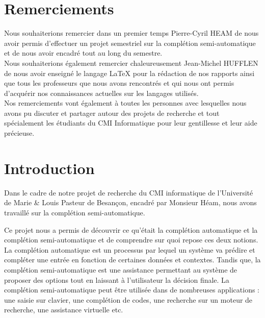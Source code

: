 \documentclass[a4paper, 11pt]{report}
\begin{document}
\chapter*{Remerciements}

Nous souhaiterions remercier dans un premier temps Pierre-Cyril HEAM de nous avoir permis d'effectuer un projet semestriel sur la complétion semi-automatique et de nous avoir encadré tout au long du semestre. \\

Nous souhaiterions également remercier chaleureusement Jean-Michel HUFFLEN de nous avoir enseigné le langage \LaTeX{} pour la rédaction de nos rapports ainsi que tous les professeurs que nous avons rencontrés et qui nous ont permis d'acquérir nos connaissances actuelles sur les langages utilisés.\\

Nos remerciements vont également à toutes les personnes avec lesquelles nous avons pu discuter et partager autour des projets de recherche et tout spécialement les étudiants du CMI Informatique pour leur gentillesse et leur aide précieuse. \\



\newpage
\tableofcontents
\listoffigures



\chapter*{Introduction} %

Dans le cadre de notre projet de recherche du CMI informatique de l’Université de Marie \& Louis Pasteur de Besançon, encadré par Monsieur Héam, nous avons travaillé sur la complétion semi-automatique.\par \vspace{\baselineskip} %


Ce projet nous a permis de découvrir ce qu'était la complétion automatique et la complétion semi-automatique et de comprendre sur quoi repose ces deux notions. La complétion automatique est un processus par lequel un système va prédire et compléter une entrée en fonction de certaines données et contextes. Tandis que, la complétion semi-automatique est une assistance permettant au système de proposer des options tout en laissant à l'utilisateur la décision finale. La complétion semi-automatique peut être utilisée dans de nombreuses applications : une saisie sur clavier, une complétion de codes, une recherche sur un moteur de recherche, une assistance virtuelle etc.\par \vspace{\baselineskip} %
\end{document}
